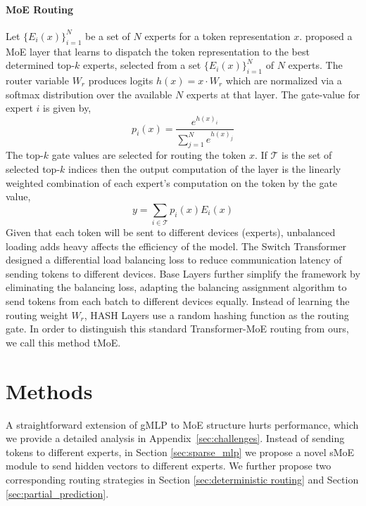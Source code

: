 \documentclass{article}
\begin{document}
\paragraph{MoE Routing}
Let $\{E_i(x)\}_{i=1}^N$ be a set of $N$ experts for a token representation $x$. 
\citet{shazeer2017outrageously} proposed a MoE layer that learns to dispatch the token representation to the best determined top-$k$ experts, selected from a set $\{E_i(x)\}_{i=1}^N$ of $N$ experts.
The router variable $W_r$ produces logits $h(x) = x \cdot W_r$ which are normalized via a softmax distribution over the available $N$ experts at that layer. The gate-value for expert $i$ is given by,
\begin{equation}
    p_i(x) = \frac{e^{h(x)_i}}{\sum_{j=1}^N e^{h(x)_j}}
\label{eq:gating}
\end{equation}
The top-$k$ gate values are selected for routing the token $x$.
If $\mathcal{T}$ is the set of selected top-$k$ indices then the output computation of the layer is the linearly weighted combination of each expert's computation on the token by the gate value,
\begin{equation}
    y = \sum_{i \in \mathcal{T}} p_i(x) E_i(x) 
\end{equation}
Given that each token will be sent to different devices (experts), unbalanced loading adds heavy affects the efficiency of the model. The Switch Transformer \citep{switch} designed a differential load balancing loss to reduce communication latency of sending tokens to different devices.  
Base Layers \citep{baselayer} further simplify the framework by eliminating the balancing loss, adapting the balancing assignment algorithm \citep{bertsekas1992auction} to send tokens from each batch to different devices equally. Instead of learning the routing weight $W_r$, HASH Layers \citep{hashlayer} use a random hashing function as the routing gate. In order to distinguish this standard Transformer-MoE routing \citep{gshard,switch,baselayer,hashlayer,alibaba} from ours, we call this method tMoE. 












 \section{Methods}
\label{sec:methods}

A straightforward extension of gMLP to MoE structure hurts performance, which we provide a detailed analysis in Appendix~\ref{sec:challenges}. Instead of sending tokens to different experts, in Section \ref{sec:sparse_mlp} we propose a novel sMoE module to send hidden vectors to different experts. We further propose two corresponding routing strategies in Section \ref{sec:deterministic routing} and Section \ref{sec:partial_prediction}. 
\end{document}
